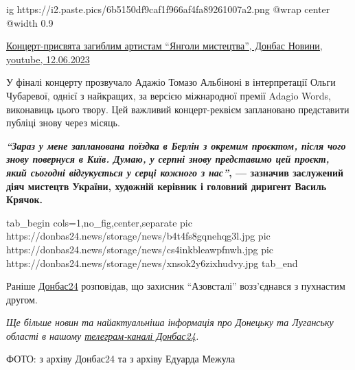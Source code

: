 \ifcmt
  ig https://i2.paste.pics/6b5150df9caf1f966af4fa89261007a2.png
  @wrap center
  @width 0.9
\fi

\href{https://youtu.be/D0xOY1ya7os}{Концерт-присвята загиблим артистам \enquote{Янголи мистецтва}, Донбас Новини, youtube, 12.06.2023}

У фіналі концерту прозвучало Адажіо Томазо Альбіноні в інтерпретації Ольги
Чубаревої, однієї з найкращих, за версією міжнародної премії Adagio Words,
виконавиць цього твору. Цей важливий концерт-реквієм заплановано представити
публіці знову через місяць. 

\begin{leftbar}
  \begingroup
    \bfseries
{\em\color{blue}\enquote{Зараз у мене запланована поїздка в Берлін з окремим проєктом, після чого
знову повернуся в Київ. Думаю, у серпні знову представимо цей проєкт,
який сьогодні відгукується у серці кожного з нас}}, — зазначив
заслужений діяч мистецтв України, художній керівник і головний диригент
Василь Крячок.
  \endgroup
\end{leftbar}

\ifcmt
  tab_begin cols=1,no_fig,center,separate
     pic https://donbas24.news/storage/news/b4t4fs8gqnehqg3l.jpg
     pic https://donbas24.news/storage/news/cs4inkbleawpfnwh.jpg
     pic https://donbas24.news/storage/news/xnsok2y6zixhudvy.jpg
  tab_end
\fi

Раніше \href{https://donbas24.news}{Донбас24} розповідав, що захисник \enquote{Азовсталі} возз'єднався з пухнастим
другом.

\begingroup
\em
Ще більше новин та найактуальніша інформація про Донецьку та Луганську області
в нашому \href{https://t.me/donbas24}{телеграм-каналі Донбас24}.

ФОТО: з архіву Донбас24 та з архіву Едуарда Межула 
\endgroup


